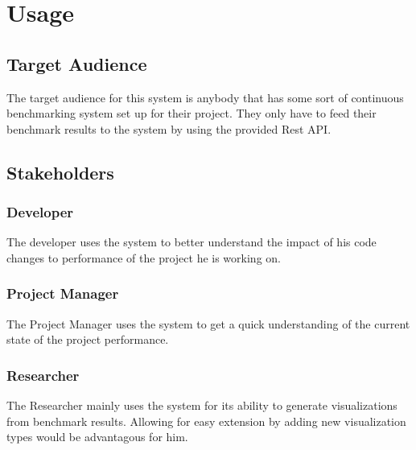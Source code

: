 \section{Usage}

\subsection{Target Audience}

The target audience for this system is anybody that has some sort of continuous benchmarking system set up for their project. They only have to feed their benchmark results to the system by using the provided Rest API.

\subsection{Stakeholders}

\subsubsection*{Developer}

The developer uses the system to better understand the impact of his code changes to performance of the project he is working on.

\subsubsection*{Project Manager}

The Project Manager uses the system to get a quick understanding of the current state of the project performance.

\subsubsection*{Researcher}

The Researcher mainly uses the system for its ability to generate \glspl{visualization} from benchmark results. Allowing for easy extension by adding new \gls{visualization} types would be advantagous for him.
